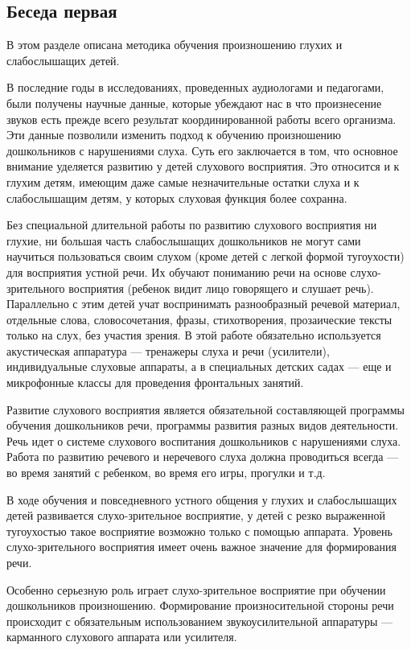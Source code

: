 \documentclass[a5paper]{book}
\begin{document}
\subsection*{Беседа первая}

В этом разделе описана методика обучения произношению глухих и
слабослышащих детей.

В последние годы в исследованиях, проведенных аудиологами и педагогами,
были получены научные данные, которые убеждают нас в что произнесение
звуков есть прежде всего результат координированной работы всего
организма. Эти данные позволили изменить подход к обучению произношению
дошкольников с нарушениями слуха. Суть его заключается в том, что
основное внимание уделяется развитию у детей слухового восприятия. Это
относится и к глухим детям, имеющим даже самые незначительные остатки
слуха и к слабослышащим детям, у которых слуховая функция более
сохранна.

Без специальной длительной работы по развитию слухового восприятия ни
глухие, ни большая часть слабослышащих дошкольников не могут сами
научиться пользоваться своим слухом (кроме детей с легкой формой
тугоухости) для восприятия устной речи. Их обучают пониманию речи на
основе слухо-зрительного восприятия (ребенок видит лицо говорящего и
слушает речь). Параллельно с этим детей учат воспринимать разнообразный
речевой материал, отдельные слова, словосочетания, фразы, стихотворения,
прозаические тексты только на слух, без участия зрения. В этой работе
обязательно используется акустическая аппаратура --- тренажеры слуха и
речи (усилители), индивидуальные слуховые аппараты, а в специальных
детских садах --- еще и микрофонные классы для проведения фронтальных
занятий.

Развитие слухового восприятия является обязательной составляющей
программы обучения дошкольников речи, программы развития разных видов
деятельности. Речь идет о системе слухового воспитания дошкольников с
нарушениями слуха. Работа по развитию речевого и неречевого слуха должна
проводиться всегда --- во время занятий с ребенком, во время его игры,
прогулки и т.д.

В ходе обучения и повседневного устного общения у глухих и слабослышащих
детей развивается слухо-зрительное восприятие, у детей с резко
выраженной тугоухостью такое восприятие возможно только с помощью
аппарата. Уровень слухо-зрительного восприятия имеет очень важное
значение для формирования речи.

Особенно серьезную роль играет слухо-зрительное восприятие при обучении
дошкольников произношению. Формирование произносительной стороны речи
происходит с обязательным использованием звукоусилительной аппаратуры
--- карманного слухового аппарата или усилителя.
\end{document}
